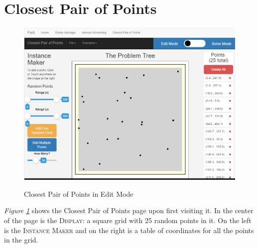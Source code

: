 \section{Closest Pair of Points}
\begin{figure}[H]
	\caption{Closest Pair of Points in Edit Mode}
	\includegraphics[width=\linewidth]
	{images/closest-pair-of-points/cpop-edit.png}
	\label{fig-cpop-edit}
	\centering
\end{figure}
\textit{Figure \ref{fig-cpop-edit}} shows the Closest Pair of Points
page upon first visiting it. 
In the center of the page is the \textsc{Display}: a square grid
with 25 random points in it. On the left is the \textsc{Instance Maker} 
and on the right is a table of coordinates for all the points in the grid.
